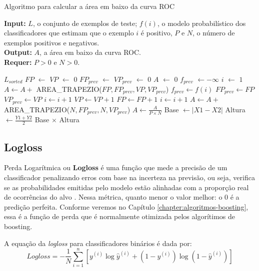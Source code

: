 \begin{algorithm}[H]
\caption{Algoritmo para calcular a área em baixo da curva ROC}\label{algoritmo:auc}
\label{algo:auc}
\textbf{Input:} $L$, o conjunto de exemplos de teste; $f(i)$, o modelo probabilístico
dos classificadores que estimam que o exemplo $i$ é positivo, $P$ e $N$, o
número de exemplos positivos e negativos.\\
\textbf{Output:} $A$, a área em baixo da curva ROC. \\
\textbf{Requer:} $P>0$ e $N>0$. \\
\begin{algorithmic}[1]
\State $L_{sorted}$ 
\State $FP$ $\leftarrow$ $VP$ $\leftarrow$ $0$ 
\State $FP_{prev}$ $\leftarrow$ $VP_{prev}$ $\leftarrow$ $0$ 
\State $A$ $\leftarrow$ $0$
\State $f_{prev}$ $\leftarrow -\infty$ 
\State $i$ $\leftarrow$ $1$
\State $A \leftarrow A +$  AREA\_TRAPEZIO($FP,FP_{prev},VP,VP_{prev}$)
\State $f_{prev} \leftarrow f(i)$
\State $FP_{prev} \leftarrow FP$
\State $VP_{prev} \leftarrow VP$
\EndIf
\State $i \leftarrow i + 1$
\State $VP \leftarrow VP + 1$
\Else
\State $FP \leftarrow FP + 1$
\EndIf
\State $i \leftarrow i + 1$
\EndWhile
\State $A \leftarrow A +$  AREA\_TRAPEZIO($N,FP_{prev},N,VP_{prev}$)
\State $A \leftarrow  \frac{A}{P \times N}$
\State Base $\leftarrow |X1 - X2|$
\State Altura $\leftarrow \frac{Y1+Y2}{2}$
\State \Return Base $\times$ Altura
\EndFunction
\end{algorithmic}
\end{algorithm}

\subsection{Logloss}
Perda Logarítmica ou \textbf{Logloss} é uma função que mede a precisão de um classificador penalizando erros com base na incerteza na previsão, ou seja, verifica se as probabilidades emitidas pelo modelo estão alinhadas com a proporção real de ocorrências do alvo \cite{DBLP:journals/corr/Vovk15}. Nessa métrica, quanto menor o valor melhor: o 0 é a predição perfeita. Conforme veremos no Capítulo \ref{chapter:algoritmos-boosting}, essa é a função de perda que é normalmente otimizada pelos algorítimos de boosting.

A equação da \textit{logloss} para classificadores binários é dada por:
\begin{equation}
    Logloss = -\frac{1}{N}\sum_{i=1}^n[y^{(i)}\log \hat{y}^{(i)} + (1-y^{(i)})\log(1-\hat{y}^{(i)})]
\end{equation}

